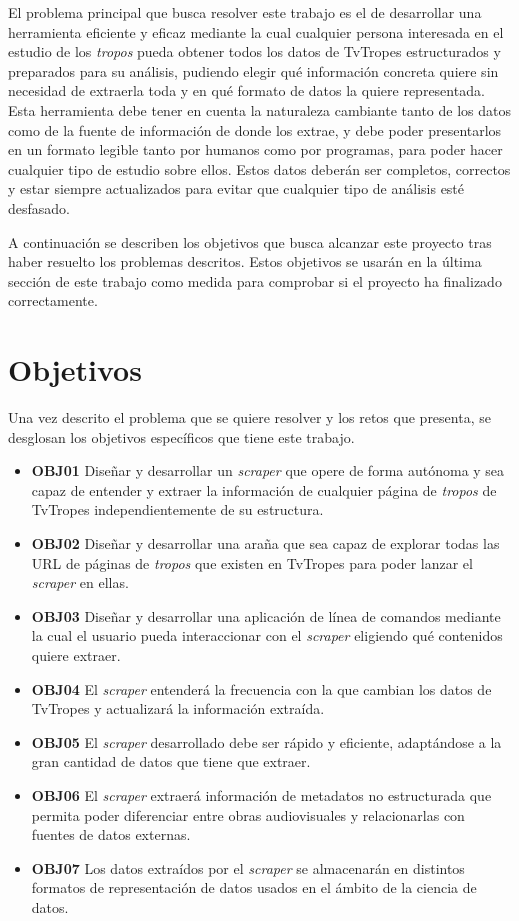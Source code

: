 El problema principal que busca resolver este trabajo es el de desarrollar una
herramienta eficiente y eficaz mediante la cual cualquier persona interesada en
el estudio de los \textit{tropos} pueda obtener todos los datos de TvTropes
estructurados y preparados para su análisis, pudiendo elegir qué información
concreta quiere sin necesidad de extraerla toda y en qué formato de datos la
quiere representada. Esta herramienta debe tener en cuenta la naturaleza
cambiante tanto de los datos como de la fuente de información de donde los
extrae, y debe poder presentarlos en un formato legible tanto por humanos como
por programas, para poder hacer cualquier tipo de estudio sobre ellos. Estos
datos deberán ser completos, correctos y estar siempre actualizados para evitar
que cualquier tipo de análisis esté desfasado.

A continuación se describen los objetivos que busca alcanzar este proyecto tras
haber resuelto los problemas descritos. Estos objetivos se usarán en la última
sección de este trabajo como medida para comprobar si el proyecto ha finalizado
correctamente.

\section{Objetivos}
Una vez descrito el problema que se quiere resolver y los retos que presenta, se
desglosan los objetivos específicos que tiene este trabajo.

\begin{itemize}
    \item \textbf{OBJ01} Diseñar y desarrollar un \textit{scraper} que opere de
    forma autónoma y sea capaz de entender y extraer la información de cualquier
    página de \textit{tropos} de TvTropes independientemente de su estructura.
    \item \textbf{OBJ02} Diseñar y desarrollar una araña que sea capaz de
    explorar todas las URL de páginas de \textit{tropos} que existen en TvTropes
    para poder lanzar el \textit{scraper} en ellas.
    \item \textbf{OBJ03} Diseñar y desarrollar una aplicación de línea de
    comandos mediante la cual el usuario pueda interaccionar con el
    \textit{scraper} eligiendo qué contenidos quiere extraer.
    \item \textbf{OBJ04} El \textit{scraper} entenderá la frecuencia con la que
    cambian los datos de TvTropes y actualizará la información extraída.
    \item \textbf{OBJ05} El \textit{scraper} desarrollado debe ser rápido y
    eficiente, adaptándose a la gran cantidad de datos que tiene que extraer.
    \item \textbf{OBJ06} El \textit{scraper} extraerá información de metadatos
    no estructurada que permita poder diferenciar entre obras audiovisuales y
    relacionarlas con fuentes de datos externas.
    \item \textbf{OBJ07} Los datos extraídos por el \textit{scraper} se
    almacenarán en distintos formatos de representación de datos usados en el
    ámbito de la ciencia de datos.
\end{itemize}

